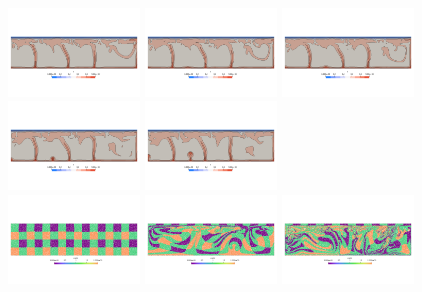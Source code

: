\begin{center}
\includegraphics[width=3.5cm]{python_codes/fieldstone_88/results/model2/T0015.png}
\includegraphics[width=3.5cm]{python_codes/fieldstone_88/results/model2/T0016.png}
\includegraphics[width=3.5cm]{python_codes/fieldstone_88/results/model2/T0017.png}
\includegraphics[width=3.5cm]{python_codes/fieldstone_88/results/model2/T0018.png}
\includegraphics[width=3.5cm]{python_codes/fieldstone_88/results/model2/T0019.png}\\
\includegraphics[width=3.5cm]{python_codes/fieldstone_88/results/model2/m0000.png}
\includegraphics[width=3.5cm]{python_codes/fieldstone_88/results/model2/m0004.png}
\includegraphics[width=3.5cm]{python_codes/fieldstone_88/results/model2/m0009.png}

\end{center}
